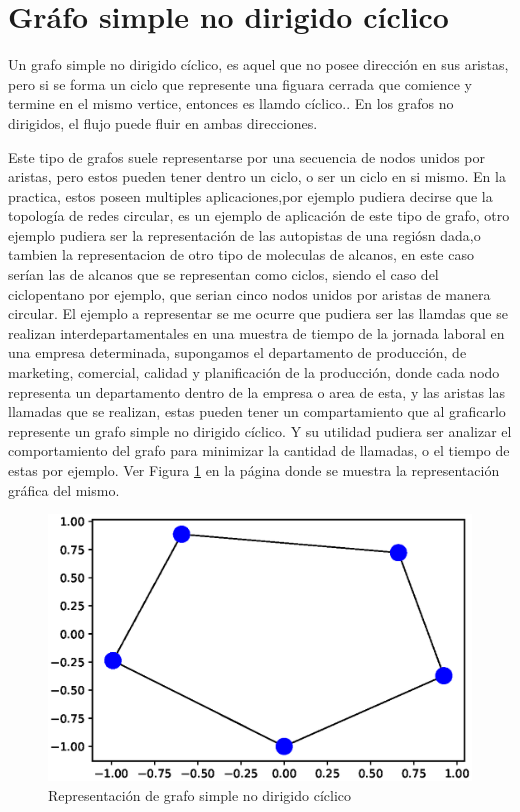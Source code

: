 \documentclass{article}
\begin{document}
\section{Gráfo simple no dirigido cíclico}

Un grafo simple no dirigido cíclico, es aquel que no posee dirección en sus aristas, pero si se forma un ciclo que represente una figuara cerrada que comience y termine en el mismo vertice, entonces es llamdo cíclico.\cite{redes}. En los grafos no dirigidos, el flujo puede fluir en ambas direcciones.

Este tipo de grafos suele representarse por una secuencia de nodos unidos por aristas, pero estos pueden tener dentro un ciclo, o ser un ciclo en si mismo. En la practica, estos poseen multiples aplicaciones,por ejemplo pudiera decirse que la topología de redes circular, es un ejemplo de aplicación de este tipo de grafo, otro ejemplo pudiera ser la representación de las autopistas de una regiósn dada,o tambien la representacion de otro tipo de moleculas de alcanos, en este caso serían las de alcanos que se representan como ciclos, siendo el caso del ciclopentano por ejemplo, que serian cinco nodos unidos por aristas de manera circular. El ejemplo a representar se me ocurre que pudiera ser las llamdas que se realizan interdepartamentales en una muestra de tiempo de  la jornada laboral en una empresa determinada, supongamos el departamento de producción, de marketing, comercial, calidad y planificación de la producción, donde cada nodo representa un departamento dentro de la empresa o area de esta, y las aristas las llamadas que se realizan, estas pueden tener un compartamiento que al graficarlo represente un grafo simple no dirigido cíclico. Y su utilidad pudiera ser analizar el comportamiento del grafo para minimizar la cantidad de llamadas, o el tiempo de estas por ejemplo.   Ver Figura \ref{fig:Fig02} en la página \pageref{fig:Fig02} donde se muestra la representación gráfica del mismo. 




\begin{figure}
    \centering
    \includegraphics[scale=0.4]{imagenes/Fig02.eps}
    \caption{Representación de grafo simple no dirigido cíclico}
    \label{fig:Fig02}
\end{figure}
\end{document}

